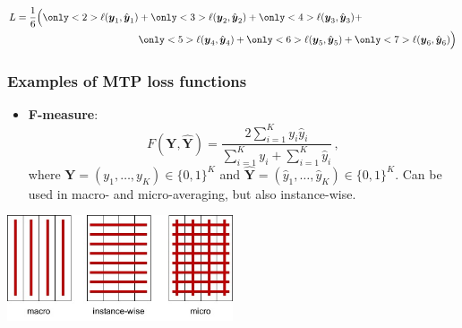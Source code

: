 \documentclass[]{beamer}
\renewcommand{\vec}[1]{\boldsymbol{#1}}
\renewcommand{\emph}[1]{\textbf{\color{putblue}#1}}
\begin{document}
\begin{frame}
\begin{align*}
L = \frac{1}{6} \Big( {\only<2>{\color{putred}}\ell(\vec{y}_1,\hat{\vec{y}}_1)}  & + 
{\only<3>{\color{putred}}\ell(\vec{y}_2,\hat{\vec{y}}_2)} +
{\only<4>{\color{putred}}\ell(\vec{y}_3,\hat{\vec{y}}_3)} + \\
& {\only<5>{\color{putred}}\ell(\vec{y}_4,\hat{\vec{y}}_4)} +
{\only<6>{\color{putred}}\ell(\vec{y}_5,\hat{\vec{y}}_5)} +
{\only<7>{\color{putred}}\ell(\vec{y}_6,\hat{\vec{y}}_6)} 
\Big)
\end{align*}

\end{frame}




\begin{frame}
\frametitle{Examples of MTP loss functions}
\begin{itemize}

\item \emph{F-measure}:
$$
F(\mathbf{Y}, \hat{\mathbf{Y}}) = \frac{2 \sum_{i=1}^K y_i \hat{y}_i}{\sum_{i=1}^K y_i + \sum_{i=1}^K \hat{y}_i} \, ,
$$
where $\mathbf{Y} = (y_1, \ldots , y_K) \in \{ 0,1 \}^K$ and $\hat{\mathbf{Y}} = (\hat{y}_1, \ldots , \hat{y}_K) \in \{ 0,1 \}^K$. Can be used in macro- and micro-averaging, but also instance-wise. 
\end{itemize}
\pause

\bigskip

\begin{center}
\includegraphics[width=0.5\textwidth]{Figures/pictures/fmeasure}
\end{center}


\end{frame}
\end{document}
